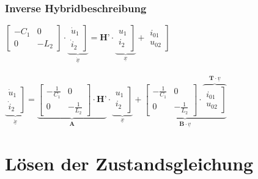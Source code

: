 \documentclass[a4paper,twocolumn,10pt]{article}
\begin{document}
\subsubsection*{Inverse Hybridbeschreibung}
$\begin{bmatrix}-C_1 & 0 \\ 0 & -L_2\end{bmatrix}\cdot \underbrace{\left.\begin{matrix}\dot u_1 \\ \dot i_2\end{matrix}\right]}_{\underline{\dot x}}=\textbf{H'}\cdot \underbrace{\left.\begin{matrix}u_1 \\ i_2\end{matrix}\right]}_{\underline{x}}+\left.\begin{matrix}i_{01} \\ u_{02}\end{matrix}\right]$\\\\
$\underbrace{\left.\begin{matrix}\dot u_1 \\ \dot i_2\end{matrix}\right]}_{\underline{\dot x}}=\underbrace{\begin{bmatrix}-\frac{1}{C_1} & 0 \\ 0 & -\frac{1}{L_2}\end{bmatrix}\cdot\textbf{H'}}_{\textbf{A}}\cdot \underbrace{\left.\begin{matrix}u_1 \\ i_2\end{matrix}\right]}_{\underline{x}}+\underbrace{\begin{bmatrix}-\frac{1}{C_1} & 0 \\ 0 & -\frac{1}{L_2}\end{bmatrix}\cdot\overbrace{\left.\begin{matrix}i_{01} \\ u_{02}\end{matrix}\right]}^{\textbf{T}\cdot \underline{v}}}_{\textbf{B}\cdot \underline{v}}$

\section*{Lösen der Zustandsgleichung}
\end{document}
